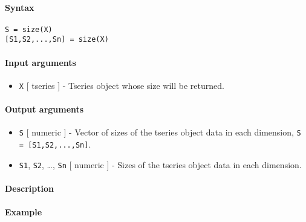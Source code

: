 


	\paragraph{Syntax}\label{syntax}

\begin{verbatim}
S = size(X)
[S1,S2,...,Sn] = size(X)
\end{verbatim}

\paragraph{Input arguments}\label{input-arguments}

\begin{itemize}
\itemsep1pt\parskip0pt
\item
  \texttt{X} {[} tseries {]} - Tseries object whose size will be
  returned.
\end{itemize}

\paragraph{Output arguments}\label{output-arguments}

\begin{itemize}
\item
  \texttt{S} {[} numeric {]} - Vector of sizes of the tseries object
  data in each dimension, \texttt{S = {[}S1,S2,...,Sn{]}}.
\item
  \texttt{S1}, \texttt{S2}, \ldots{}, \texttt{Sn} {[} numeric {]} -
  Sizes of the tseries object data in each dimension.
\end{itemize}

\paragraph{Description}\label{description}

\paragraph{Example}\label{example}


